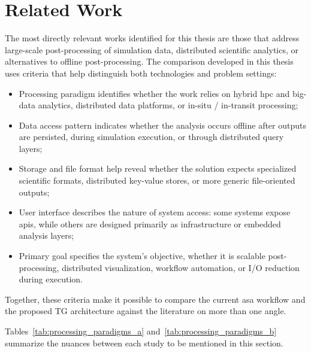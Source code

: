\section{Related Work}
\label{sec:cap2-related-work}

The most directly relevant works identified for this thesis are those that address large-scale post-processing of simulation data, distributed scientific analytics, or alternatives to offline post-processing. The comparison developed in this thesis uses criteria that help distinguish both technologies and problem settings:

\begin{itemize}
    \item Processing paradigm identifies whether the work relies on hybrid \gls{hpc} and big-data analytics, distributed data platforms, or in-situ / in-transit processing;
    \item Data access pattern indicates whether the analysis occurs offline after outputs are persisted, during simulation execution, or through distributed query layers;
    \item Storage and file format help reveal whether the solution expects specialized scientific formats, distributed key-value stores, or more generic file-oriented outputs;
    \item User interface describes the nature of system access: some systems expose \gls{api}s, while others are designed primarily as infrastructure or embedded analysis layers;
    \item Primary goal specifies the system's objective, whether it is scalable post-processing, distributed visualization, workflow automation, or I/O reduction during execution.
\end{itemize}

Together, these criteria make it possible to compare the current \gls{asa} workflow and the proposed TG architecture against the literature on more than one angle.

Tables~\ref{tab:processing_paradigms_a} and~\ref{tab:processing_paradigms_b} summarize the nuances between each study to be mentioned in this section.

